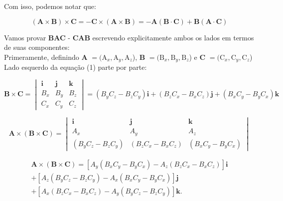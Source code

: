 \documentclass[a4paper,12pt]{article}
\begin{document}
Com isso, podemos notar que:

\begin{equation}
    (\textbf{A}\times\textbf{B})\times\textbf{C} = -\textbf{C}\times(\textbf{A}\times\textbf{B}) = -\textbf{A}(\textbf{B}\cdot\textbf{C}) + \textbf{B}(\textbf{A}\cdot\textbf{C})
\end{equation}

Vamos provar \textbf{BAC} - \textbf{CAB} escrevendo explicitamente ambos os lados em termos de suas componentes:\\

Primeramente, definindo \textbf{A} $= (\textrm{A}_{x}, \textrm{A}_{y}, \textrm{A}_{z}$), \textbf{B} $= (\textrm{B}_{x}, \textrm{B}_{y}, \textrm{B}_{z}$) 
e \textbf{C} $= (\textrm{C}_{x}, \textrm{C}_{y}, \textrm{C}_{z}$)\\

Lado esquerdo da equa\c{c}\~ao (1) parte por parte:

\begin{equation}
    \mathbf{B} \times \mathbf{C} =
\begin{vmatrix}
\mathbf{i} & \mathbf{j} & \mathbf{k} \\
B_x & B_y & B_z \\
C_x & C_y & C_z
\end{vmatrix} =
(B_yC_z - B_zC_y)\mathbf{i} +
(B_zC_x - B_xC_z)\mathbf{j} +
(B_xC_y - B_yC_x)\mathbf{k}
\end{equation}


\begin{equation}
\mathbf{A} \times (\mathbf{B} \times \mathbf{C}) =
\begin{vmatrix}
\mathbf{i} & \mathbf{j} & \mathbf{k} \\
A_x & A_y & A_z \\
(B_yC_z - B_zC_y) & (B_zC_x - B_xC_z) & (B_xC_y - B_yC_x)
\end{vmatrix}
\end{equation}

\begin{equation}
    \begin{aligned}
    \mathbf{A} \times (\mathbf{B} \times \mathbf{C}) = \left[ A_y(B_xC_y - B_yC_x) - A_z(B_zC_x - B_xC_z) \right] \mathbf{i} \\ +
    \left[A_z(B_yC_z - B_zC_y) - A_x(B_xC_y - B_yC_x) \right] \mathbf{j}\\ +
    \left[ A_x(B_zC_x - B_xC_z) - A_y(B_yC_z - B_zC_y) \right] \mathbf{k}.
\end{aligned}
\end{equation}\\
\end{document}
